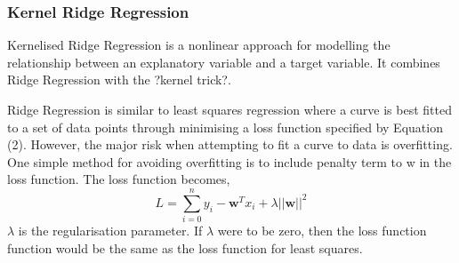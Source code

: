 \documentclass[a4paper,11pt,twoside]{article}
\begin{document}
\subsubsection{Kernel Ridge Regression}
Kernelised Ridge Regression is a nonlinear approach for modelling the relationship between an explanatory variable and a target variable. It combines Ridge Regression with the ?kernel trick?.

Ridge Regression is similar to least squares regression where a curve is best fitted to a set of data points through minimising a loss function specified by Equation (2). However, the major risk when attempting to fit a curve to data is overfitting. One simple method for avoiding overfitting is to include penalty term to w in the loss function. The loss function becomes, 
\begin{equation}
L = \sum_{i=0}^{n}y_{i} - \textbf{w}^Tx_{i} + \lambda||\textbf{w}||^2
\end{equation}
$\lambda$ is the regularisation parameter. If $\lambda$ were to be zero, then the loss function function would be the same as the loss function for least squares.
\end{document}
